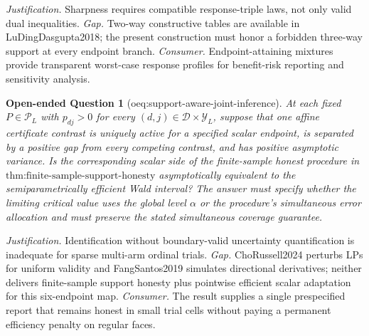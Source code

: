 \documentclass{article}
\newtheorem{openendedquestion}{Open-ended Question}
\begin{document}
\par\smallskip\noindent \textit{Justification.} Sharpness requires compatible response-triple laws, not only valid dual inequalities. \textit{Gap.} Two-way constructive tables are available in LuDingDasgupta2018; the present construction must honor a forbidden three-way support at every endpoint branch. \textit{Consumer.} Endpoint-attaining mixtures provide transparent worst-case response profiles for benefit-risk reporting and sensitivity analysis.

\begin{openendedquestion}[oeq:support-aware-joint-inference]\label{oeq:support-aware-joint-inference}
At each fixed \(P\in\mathcal P_L\) with \(p_{dj}>0\) for every \((d,j)\in\mathcal D\times\mathcal Y_L\), suppose that one affine certificate contrast is uniquely active for a specified scalar endpoint, is separated by a positive gap from every competing contrast, and has positive asymptotic variance.  Is the corresponding scalar side of the finite-sample honest procedure in \(\text{thm:finite-sample-support-honesty}\) asymptotically equivalent to the semiparametrically efficient Wald interval?  The answer must specify whether the limiting critical value uses the global level \(\alpha\) or the procedure's simultaneous error allocation and must preserve the stated simultaneous coverage guarantee.
\end{openendedquestion}
\par\smallskip\noindent \textit{Justification.} Identification without boundary-valid uncertainty quantification is inadequate for sparse multi-arm ordinal trials. \textit{Gap.} ChoRussell2024 perturbs LPs for uniform validity and FangSantos2019 simulates directional derivatives; neither delivers finite-sample support honesty plus pointwise efficient scalar adaptation for this six-endpoint map. \textit{Consumer.} The result supplies a single prespecified report that remains honest in small trial cells without paying a permanent efficiency penalty on regular faces.
\end{document}
